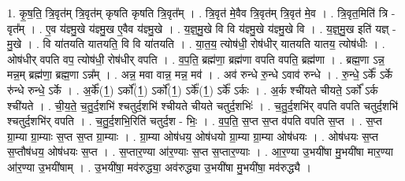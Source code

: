 \documentclass[17pt]{extarticle}
\begin{document}
1. कृ॒ष॒ति॒ त्रि॒वृत॑म् त्रि॒वृत॑म् कृषति कृषति त्रि॒वृत᳚म् । . त्रि॒वृत॑ मे॒वैव त्रि॒वृत॑म् त्रि॒वृत॑ मे॒व । . त्रि॒वृत॒मिति॑ त्रि - वृत᳚म् । . ए॒व य॑ज्ञ्मु॒खे य॑ज्ञ्मु॒ख ए॒वैव य॑ज्ञ्मु॒खे । . य॒ज्ञ्॒मु॒खे वि वि य॑ज्ञ्मु॒खे य॑ज्ञ्मु॒खे वि । . य॒ज्ञ्॒मु॒ख इति॑ यज्ञ् - मु॒खे । . वि या॑तयति यातयति॒ वि वि या॑तयति । . या॒त॒य॒ त्योष॑धी॒ रोष॑धीर् यातयति यातय॒ त्योष॑धीः । . ओष॑धीर् वपति वप॒ त्योष॑धी॒ रोष॑धीर् वपति । . व॒प॒ति॒ ब्रह्म॑णा॒ ब्रह्म॑णा वपति वपति॒ ब्रह्म॑णा । . ब्रह्म॒णा ऽन्न॒ मन्न॒म् ब्रह्म॑णा॒ ब्रह्म॒णा ऽन्न᳚म् । . अन्न॒ मवा वान्न॒ मन्न॒ मव॑ । . अव॑ रुन्धे रु॒न्धे ऽवाव॑ रुन्धे । . रु॒न्धे॒ ऽर्के᳚ ऽर्के रु॑न्धे रुन्धे॒ ऽर्के । . अ॒र्के᳚(1॒) ऽर्को᳚(1॒) ऽर्को᳚(1॒) ऽर्के᳚(1॒) ऽर्के᳚ ऽर्कः । . अ॒र्क श्ची॑यते चीयते॒ ऽर्को᳚ ऽर्क श्ची॑यते । . ची॒य॒ते॒ च॒तु॒र्द॒शभि॑ श्चतुर्द॒शभि॑ श्चीयते चीयते चतुर्द॒शभिः॑ । . च॒तु॒र्द॒शभि॑र् वपति वपति चतुर्द॒शभि॑ श्चतुर्द॒शभि॑र् वपति । . च॒तु॒र्द॒शभि॒रिति॑ चतुर्द॒श - भिः॒ । . व॒प॒ति॒ स॒प्त स॒प्त व॑पति वपति स॒प्त । . स॒प्त ग्रा॒म्या ग्रा॒म्याः स॒प्त स॒प्त ग्रा॒म्याः । . ग्रा॒म्या ओष॑धय॒ ओष॑धयो ग्रा॒म्या ग्रा॒म्या ओष॑धयः । . ओष॑धयः स॒प्त स॒प्तौष॑धय॒ ओष॑धयः स॒प्त । . स॒प्तार॒ण्या आ॑र॒ण्याः स॒प्त स॒प्तार॒ण्याः । . आ॒र॒ण्या उ॒भयी॑षा मु॒भयी॑षा मार॒ण्या आ॑र॒ण्या उ॒भयी॑षाम् । . उ॒भयी॑षा॒ मव॑रुद्ध्या॒ अव॑रुद्ध्या उ॒भयी॑षा मु॒भयी॑षा॒ मव॑रुद्ध्यै । \newline
\end{document}
